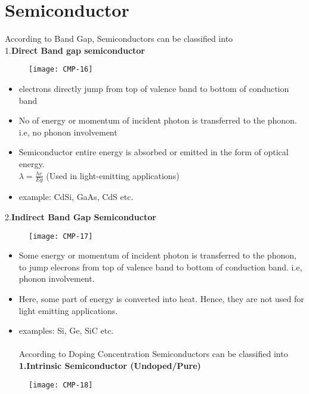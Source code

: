 \section{Semiconductor}
According to Band Gap, Semiconductors can be classified into\\
1.\quad \textbf{Direct Band gap semiconductor}
\begin{figure}[H]
	\centering
	\texttt{[image: CMP-16]}
	\caption{}
	\label{}
\end{figure}
\begin{itemize}
	\item electrons directly jump from top of valence band to bottom of conduction band
	\item No of energy or momentum of incident photon is transferred to the phonon.\\
	i.e, no phonon involvement
	\item Semiconductor entire energy is absorbed or emitted in the form of optical energy.\\
	$\lambda=\frac{h c}{E g}$ (Used in light-emitting applications)
	\item example: CdSi, GaAs, CdS etc.
\end{itemize}
2.\quad \textbf{Indirect Band Gap Semiconductor}
\begin{figure}[H]
	\centering
	\texttt{[image: CMP-17]}
	\caption{}
	\label{}
\end{figure}
\begin{itemize}
	\item Some energy or momentum of incident photon is transferred to the phonon, to jump elecrons from top of valence band to bottom of conduction band. i.e, phonon involvement.
	\item Here, some part of energy is converted into heat. Hence, they are not used for light emitting applications.
	\item examples: Si, Ge, SiC etc.\\\\
	According to Doping Concentration Semiconductors can be classified into\\
	\textbf{1.Intrinsic Semiconductor (Undoped/Pure)}\\
	
\end{itemize}
\begin{figure}[H]
	\centering
	\texttt{[image: CMP-18]}
	\caption{}
	\label{}
\end{figure}
